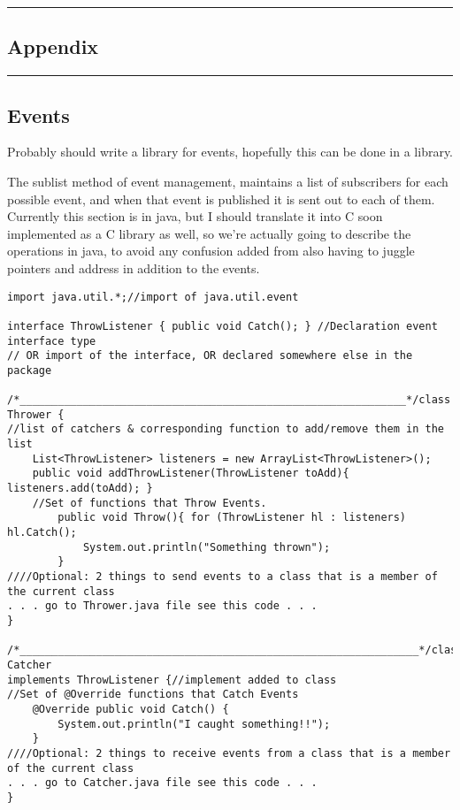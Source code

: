 \begin{center}\rule{0.5\linewidth}{0.5pt}\end{center}

\hypertarget{appendix}{%
\subsection{Appendix}\label{appendix}}

\begin{center}\rule{0.5\linewidth}{0.5pt}\end{center}

\hypertarget{events}{%
\subsection{Events}\label{events}}

Probably should write a library for events, hopefully this can be done
in a library.

The sublist method of event management, maintains a list of subscribers
for each possible event, and when that event is published it is sent out
to each of them. Currently this section is in java, but I should
translate it into C soon implemented as a C library as well, so we're
actually going to describe the operations in java, to avoid any
confusion added from also having to juggle pointers and address in
addition to the events.

\begin{verbatim}
import java.util.*;//import of java.util.event

interface ThrowListener { public void Catch(); } //Declaration event interface type
// OR import of the interface, OR declared somewhere else in the package

/*_____________________________________________________________*/class Thrower {
//list of catchers & corresponding function to add/remove them in the list
    List<ThrowListener> listeners = new ArrayList<ThrowListener>();
    public void addThrowListener(ThrowListener toAdd){ listeners.add(toAdd); }
    //Set of functions that Throw Events.
        public void Throw(){ for (ThrowListener hl : listeners) hl.Catch();
            System.out.println("Something thrown");
        }
////Optional: 2 things to send events to a class that is a member of the current class
. . . go to Thrower.java file see this code . . .
}

/*_______________________________________________________________*/class Catcher
implements ThrowListener {//implement added to class
//Set of @Override functions that Catch Events
    @Override public void Catch() {
        System.out.println("I caught something!!");
    }
////Optional: 2 things to receive events from a class that is a member of the current class
. . . go to Catcher.java file see this code . . .
}
\end{verbatim}

